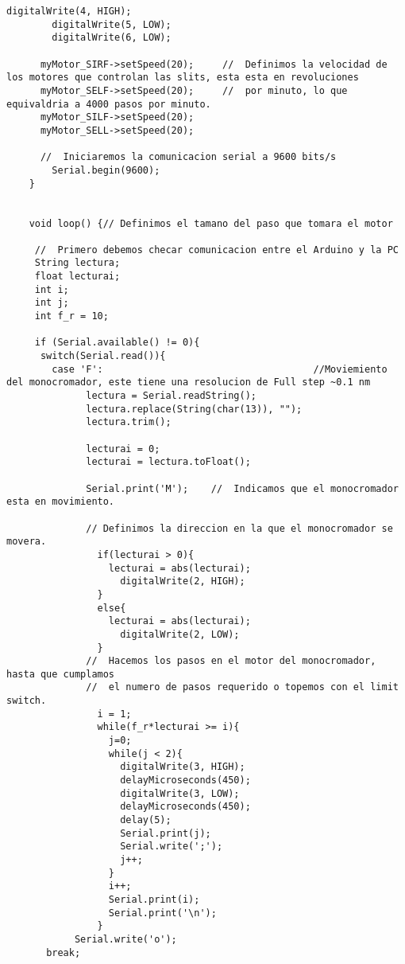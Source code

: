 \begin{lstlisting}[style=Arduino]
        digitalWrite(4, HIGH);
        digitalWrite(5, LOW);
        digitalWrite(6, LOW);
    
      myMotor_SIRF->setSpeed(20);     //  Definimos la velocidad de los motores que controlan las slits, esta esta en revoluciones
      myMotor_SELF->setSpeed(20);     //  por minuto, lo que equivaldria a 4000 pasos por minuto.
      myMotor_SILF->setSpeed(20);
      myMotor_SELL->setSpeed(20);
      
      //  Iniciaremos la comunicacion serial a 9600 bits/s
        Serial.begin(9600);
    }
    
      
    void loop() {// Definimos el tamano del paso que tomara el motor
     
     //  Primero debemos checar comunicacion entre el Arduino y la PC
     String lectura;
     float lecturai;
     int i;
     int j;
     int f_r = 10;
     
     if (Serial.available() != 0){
      switch(Serial.read()){
        case 'F':                                     //Moviemiento del monocromador, este tiene una resolucion de Full step ~0.1 nm
              lectura = Serial.readString();
              lectura.replace(String(char(13)), "");
              lectura.trim();
              
              lecturai = 0;
              lecturai = lectura.toFloat();
    
              Serial.print('M');    //  Indicamos que el monocromador esta en movimiento.
              
              // Definimos la direccion en la que el monocromador se movera.
                if(lecturai > 0){
                  lecturai = abs(lecturai);
                    digitalWrite(2, HIGH);
                }
                else{
                  lecturai = abs(lecturai);
                    digitalWrite(2, LOW);
                }
              //  Hacemos los pasos en el motor del monocromador, hasta que cumplamos 
              //  el numero de pasos requerido o topemos con el limit switch.
                i = 1;
                while(f_r*lecturai >= i){
                  j=0;
                  while(j < 2){
                    digitalWrite(3, HIGH);
                    delayMicroseconds(450);
                    digitalWrite(3, LOW);
                    delayMicroseconds(450);
                    delay(5);
                    Serial.print(j);
                    Serial.write(';');
                    j++;
                  }
                  i++;
                  Serial.print(i);
                  Serial.print('\n');
                }      
            Serial.write('o');
       break;
    

\end{lstlisting}
